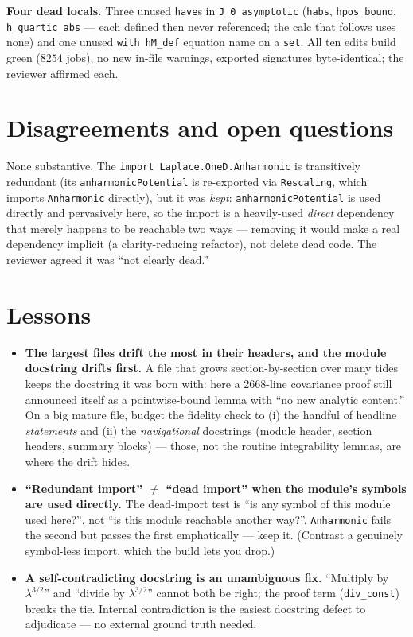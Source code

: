 \documentclass[11pt]{article}
\begin{document}
\textbf{Four dead locals.} Three unused \texttt{have}s in \texttt{J\_0\_asymptotic}
(\texttt{habs}, \texttt{hpos\_bound}, \texttt{h\_quartic\_abs} --- each defined then never referenced;
the calc that follows uses none) and one unused \texttt{with hM\_def} equation name on a \texttt{set}.
All ten edits build green ($8254$ jobs), no new in-file warnings, exported signatures byte-identical;
the reviewer affirmed each.

\section{Disagreements and open questions}
None substantive. The \texttt{import Laplace.OneD.Anharmonic} is transitively redundant (its
\texttt{anharmonicPotential} is re-exported via \texttt{Rescaling}, which imports \texttt{Anharmonic}
directly), but it was \emph{kept}: \texttt{anharmonicPotential} is used directly and pervasively here,
so the import is a heavily-used \emph{direct} dependency that merely happens to be reachable two ways
--- removing it would make a real dependency implicit (a clarity-reducing refactor), not delete dead
code. The reviewer agreed it was ``not clearly dead.''

\section{Lessons}
\begin{itemize}[noitemsep]
  \item \textbf{The largest files drift the most in their headers, and the module docstring drifts
    first.} A file that grows section-by-section over many tides keeps the docstring it was born with:
    here a 2668-line covariance proof still announced itself as a pointwise-bound lemma with ``no new
    analytic content.'' On a big mature file, budget the fidelity check to (i) the handful of headline
    \emph{statements} and (ii) the \emph{navigational} docstrings (module header, section headers,
    summary blocks) --- those, not the routine integrability lemmas, are where the drift hides.
  \item \textbf{``Redundant import'' $\ne$ ``dead import'' when the module's symbols are used
    directly.} The dead-import test is ``is any symbol of this module used here?'', not ``is this
    module reachable another way?''. \texttt{Anharmonic} fails the second but passes the first
    emphatically --- keep it. (Contrast a genuinely symbol-less import, which the build lets you
    drop.)
  \item \textbf{A self-contradicting docstring is an unambiguous fix.} ``Multiply by $\lambda^{3/2}$''
    and ``divide by $\lambda^{3/2}$'' cannot both be right; the proof term (\texttt{div\_const})
    breaks the tie. Internal contradiction is the easiest docstring defect to adjudicate --- no
    external ground truth needed.
\end{itemize}
\end{document}
